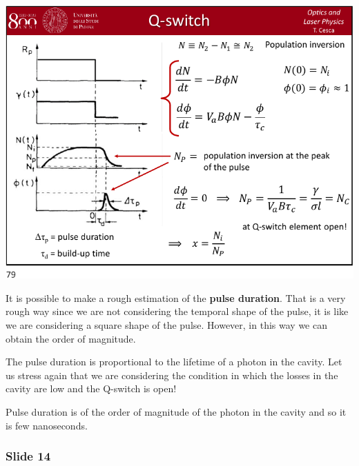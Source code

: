 \documentclass[../main/main.tex]{subfiles}
\begin{document}
\begin{minipage}[]{0.5\linewidth}
\centering
\includegraphics[page=13,width=1\textwidth]{../lessons/pdf_file/15_lecture.pdf}
\end{minipage}
\hspace{0.3cm}\vspace{0.3cm}
\begin{minipage}[c]{0.47\linewidth}

It is possible to make a rough estimation of the \textbf{pulse duration}. That is a very rough way since we are not considering the temporal shape of the pulse, it is like we are considering a square shape of the pulse. However, in this way we can obtain the order of magnitude.

The pulse duration is proportional to the lifetime of a photon in the cavity. Let us stress again that we are considering the condition in which the losses in the cavity are low and the Q-switch is open!

Pulse duration is of the order of magnitude of the photon in the cavity and so it is few nanoseconds.

\end{minipage}

\subsubsection*{Slide 14}
\end{document}
